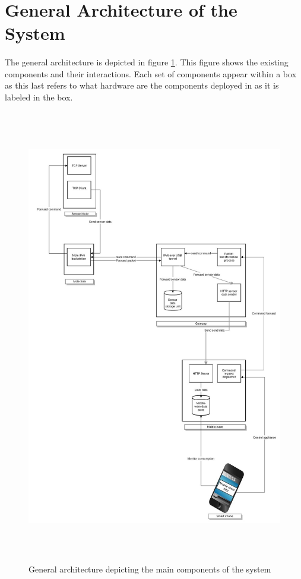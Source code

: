 \documentclass[oneside,12pt,a4paper,final]{book}
\begin{document}
\section{General Architecture of the System}
\paragraph{}
The general architecture is depicted in figure \ref{fig:gen_architecture}. This figure shows the existing components and their interactions. Each set of components appear within a box as this last refers to what hardware are the components deployed in as it is labeled in the box.
\begin{figure}[htbp]
\centering
\includegraphics[width=17cm,height=20cm,keepaspectratio]{img/general_architecture.jpg}
\caption{General architecture depicting the main components of the system}
\label{fig:gen_architecture}
\end{figure}
\end{document}
